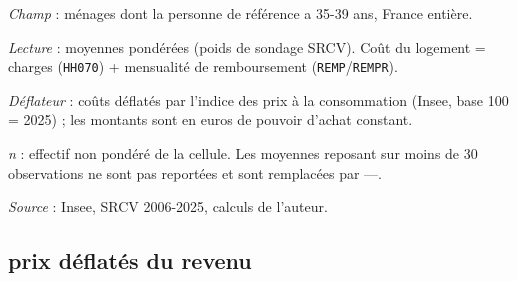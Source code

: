 \documentclass[12pt,a4paper]{article}
\begin{document}
\begin{table}[htbp]
\begin{threeparttable}
\begin{tablenotes}[flushleft]
				\item \textit{Champ} : ménages dont la personne de référence a 35-39 ans, France entière.
				\item \textit{Lecture} : moyennes pondérées (poids de sondage SRCV). Coût du logement =
				charges (\texttt{HH070}) + mensualité de remboursement (\texttt{REMP}/\texttt{REMPR}).
				\item \textit{Déflateur} : coûts déflatés par l'indice des prix à la consommation (Insee, base 100 = 2025) ; les montants sont en euros de pouvoir d'achat constant.
				\item \textit{n} : effectif non pondéré de la cellule. Les moyennes reposant sur
				moins de 30 observations ne sont pas reportées et sont remplacées par ---.
				\item \textit{Source} : Insee, SRCV 2006-2025, calculs de l'auteur.
			\end{tablenotes}
		\end{threeparttable}
	\end{table}

\newpage

\subsection{prix déflatés du revenu }\label{annexe1b}
\end{document}
